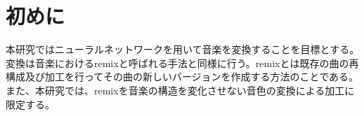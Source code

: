 \chapter{初めに}

本研究ではニューラルネットワークを用いて音楽を変換することを目標とする。変換は音楽におけるremixと呼ばれる手法と同様に行う。remixとは既存の曲の再構成及び加工を行ってその曲の新しいバージョンを作成する方法のことである。また、本研究では、remixを音楽の構造を変化させない音色の変換による加工に限定する。

\begin{comment}
既存研究の軽い紹介…。GAN,Pix2pix…。音楽の変換の研究(Hukebox,スペクトログラム,MIDI)…。この手法では…。音色の変換のみを扱うことで短期的な構造のみに着目できる点で他の音楽生成の研究よりも計算時間を削減できると期待される。
~\cite{Jukebox}
\end{comment}